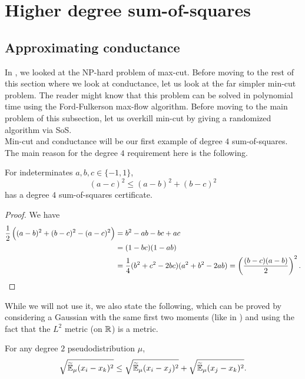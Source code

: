 
\clearpage

\section{Higher degree sum-of-squares}

\subsection{Approximating conductance}

	In , we looked at the \textsf{NP}-hard problem of max-cut. Before moving to the rest of this section where we look at conductance, let us look at the far simpler min-cut problem. The reader might know that this problem can be solved in polynomial time using the Ford-Fulkerson max-flow algorithm. Before moving to the main problem of this subsection, let us overkill min-cut by giving a randomized algorithm via SoS.\\
	Min-cut and conductance will be our first example of degree $4$ sum-of-squares. The main reason for the degree $4$ requirement here is the following.

	\begin{ftheo}
		For indeterminates $a,b,c \in \{-1,1\}$,
		\[ (a-c)^2 \le (a-b)^2 + (b-c)^2 \]
		has a degree $4$ sum-of-squares certificate.
	\end{ftheo}
	\begin{proof}
		We have
		\begin{align*}
			\frac{1}{2}\left((a-b)^2 + (b-c)^2 - (a-c)^2\right) &= b^2 - ab - bc + ac \\
				&= (1-bc)(1-ab) \\
				&= \frac{1}{4} (b^2+c^2-2bc)(a^2+b^2-2ab) = \left(\frac{(b-c)(a-b)}{2}\right)^2. \qedhere
		\end{align*}
	\end{proof}

	While we will not use it, we also state the following, which can be proved by considering a Gaussian with the same first two moments (like in ) and using the fact that the $L^2$ metric (on $\mathbb{R}$) is a metric.

	\begin{theorem}
		For any degree $2$ pseudodistribution $\mu$,
		\[ \sqrt{\widetilde{\mathbb{E}}_\mu (x_i - x_k)^2} \le \sqrt{\widetilde{\mathbb{E}}_\mu (x_i - x_j)^2} + \sqrt{\widetilde{\mathbb{E}}_\mu (x_j - x_k)^2}. \]
	\end{theorem}

